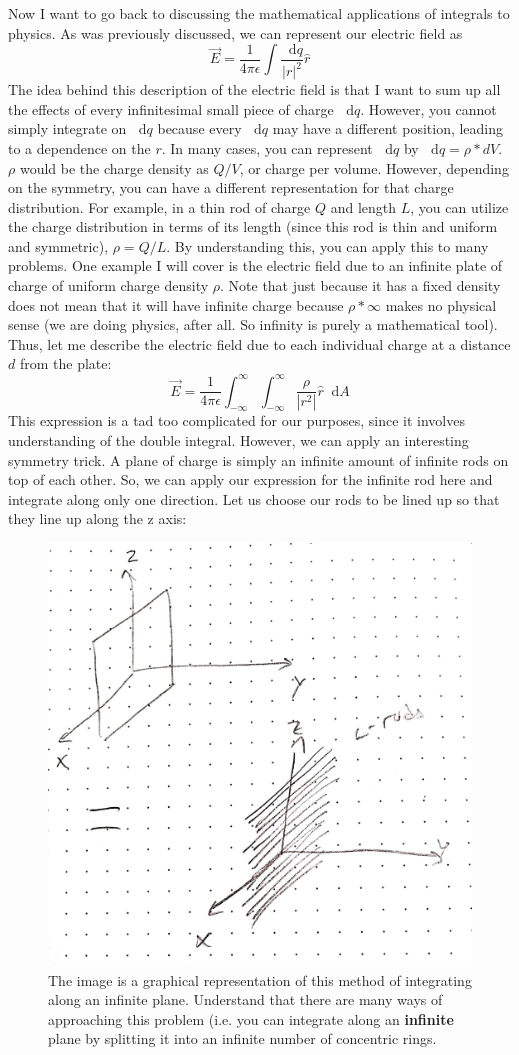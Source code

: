 \documentclass{article}
\newcommand*\dif{\mathop{}\!\mathrm{d}}
\begin{document}
Now I want to go back to discussing the mathematical applications of integrals to physics. As was previously discussed, we can represent our electric field as $$\vec{E} = \frac{1}{4\pi\epsilon}\int \frac{\dif q}{|r|^2}\hat{r}$$The idea behind this description of the electric field is that I want to sum up all the effects of every infinitesimal small piece of charge $\dif q$. However, you cannot simply integrate on $\dif q$ because every $\dif q$ may have a different position, leading to a dependence on the $r$. In many cases, you can represent $\dif q$ by $\dif q = \rho *dV$. $\rho$ would be the charge density as $Q/V$, or charge per volume. However, depending on the symmetry, you can have a different representation for that charge distribution. For example, in a thin rod of charge $Q$ and length $L$, you can utilize the charge distribution in terms of its length (since this rod is thin and uniform and symmetric), $\rho = Q/L$. By understanding this, you can apply this to many problems. One example I will cover is the electric field due to an infinite plate of charge of uniform charge density $\rho$. Note that just because it has a fixed density does not mean that it will have infinite charge because $\rho * \infty$ makes no physical sense (we are doing physics, after all. So infinity is purely a mathematical tool). Thus, let me describe the electric field due to each individual charge at a distance $d$ from the plate: $$\vec{E} = \frac{1}{4\pi\epsilon}\int_{-\infty}^{\infty}\int_{-\infty}^{\infty}\frac{\rho}{|r^2|}\hat{r}\dif A$$This expression is a tad too complicated for our purposes, since it involves understanding of the double integral. However, we can apply an interesting symmetry trick. A plane of charge is simply an infinite amount of infinite rods on top of each other. So, we can apply our expression for the infinite rod here and integrate along only one direction. Let us choose our rods to be lined up so that they line up along the z axis:
\pagebreak
\begin{figure}[ht]
\center
\includegraphics[width=.3\textwidth]{images/Week1pic3.jpg}
\caption{The image is a graphical representation of this method of integrating along an infinite plane. Understand that there are many ways of approaching this problem (i.e. you can integrate along an \textbf{infinite} plane by splitting it into an infinite number of concentric rings.}
\end{figure}\\
\end{document}
